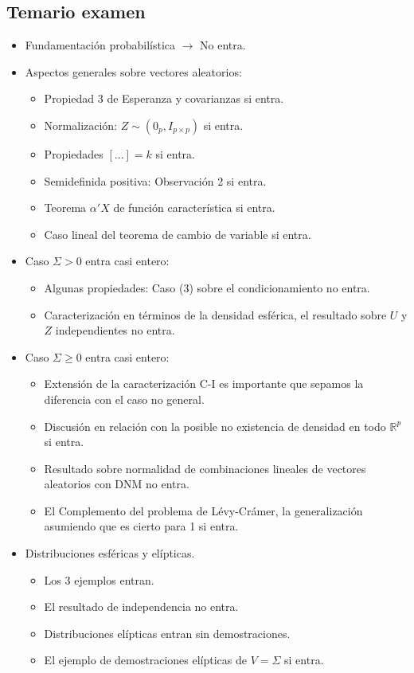 \documentclass[11pt,a4paper]{article}
\begin{document}
\subsection{Temario examen}

\begin{itemize}
\item Fundamentación probabilística $\to$ No entra.

\item Aspectos generales sobre vectores aleatorios:
\begin{itemize}
\item Propiedad 3 de Esperanza y covarianzas si entra.
\item Normalización: $Z \sim (0_{p}, I_{p \times p})$ si entra.
\item Propiedades $[...] = k$ si entra.
\item Semidefinida positiva: Observación 2 si entra.
\item Teorema $\alpha'X$ de función característica si entra.
\item Caso lineal del teorema de cambio de variable si entra.
\end{itemize}

\item Caso $\Sigma > 0$ entra casi entero:
\begin{itemize}
\item Algunas propiedades: Caso (3) sobre el condicionamiento no entra.
\item Caracterización en términos de la densidad esférica, el resultado sobre $U$ y $Z$ independientes no entra.
\end{itemize}

\item Caso $\Sigma \geq 0$ entra casi entero:
\begin{itemize}
\item Extensión de la caracterización C-I es importante que sepamos la diferencia con el caso no general.
\item Discusión en relación con la posible no existencia de densidad en todo $\mathbb{R}^{p}$ si entra.
\item Resultado sobre normalidad de combinaciones lineales de vectores aleatorios con DNM no entra.
\item El Complemento del problema de Lévy-Crámer, la generalización asumiendo que es cierto para 1 si entra.
\end{itemize}

\item Distribuciones esféricas y elípticas.
\begin{itemize}
\item Los 3 ejemplos entran.
\item El resultado de independencia no entra.
\item Distribuciones elípticas entran sin demostraciones.
\item El ejemplo de demostraciones elípticas de $V = \Sigma$ si entra.
\end{itemize}


\end{itemize}
\end{document}
